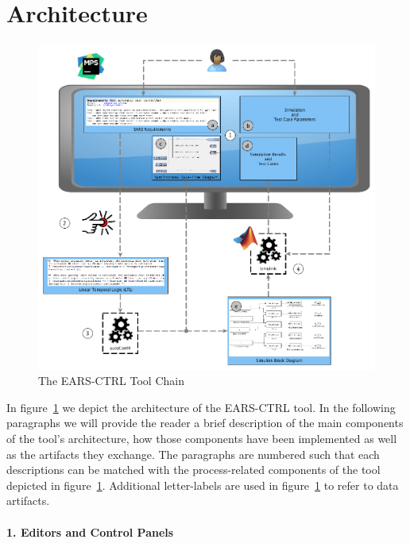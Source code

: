 \section{Architecture}

\begin{figure}[t]
   \begin{center}
     \includegraphics[width=1\textwidth]{images/toolchain.png}
     \caption{The \textsf{EARS-CTRL} Tool Chain}
     \label{fig:ears_ctrl_toolchain}
   \end{center}
 \end{figure}
 
In figure~\ref{fig:ears_ctrl_toolchain} we depict the architecture of the
\textsf{EARS-CTRL} tool. In the following paragraphs we will provide the reader
a brief description of the main components of the tool's architecture, how those
components have been implemented as well as the artifacts they exchange. The
paragraphs are numbered such that each descriptions can be matched with the 
process-related components of the tool depicted in
figure~\ref{fig:ears_ctrl_toolchain}.
Additional letter-labels are used in figure~\ref{fig:ears_ctrl_toolchain} to
refer to data artifacts.
 
\paragraph{1. Editors and Control Panels\\\\} 

